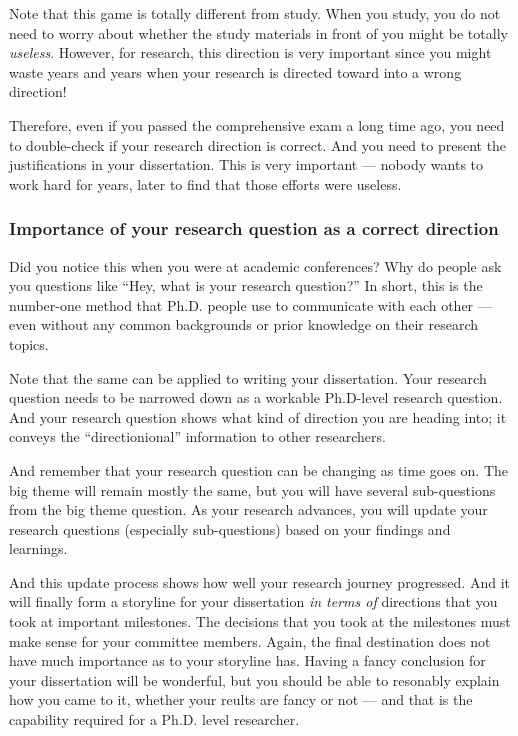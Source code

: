 \documentclass[11pt]{article}
\begin{document}
Note that this game is totally different from study. When you study, you do
not need to worry about whether the study materials in front of you might be
totally \emph{useless}. However, for research, this direction is very
important since you might waste years and years when your research is directed
toward into a wrong direction!

Therefore, even if you passed the comprehensive exam a long time ago, you need
to double-check if your research direction is correct. And you need to present
the justifications in your dissertation. This is very important --- nobody
wants to work hard for years, later to find that those efforts were useless. 


\subsubsection{Importance of your research question as a correct direction}

Did you notice this when you were at academic conferences? Why do people ask
you questions like ``Hey, what is your research question?'' In short, this is
the number-one method that Ph.D. people use to communicate with each other ---
even without any common backgrounds or prior knowledge on their research
topics.

Note that the same can be applied to writing your dissertation.  Your research
question needs to be narrowed down as a workable Ph.D-level research question.
And your research question shows what kind of direction you are heading into;
it conveys the ``directionional'' information to other researchers.

And remember that your research question can be changing as time goes on. The
big theme will remain mostly the same, but you will have several sub-questions
from the big theme question. As your research advances, you will update your
research questions (especially sub-questions) based on your findings and
learnings. 

And this update process shows how well your research journey progressed. And
it will finally form a storyline for your dissertation \emph{in terms of}
directions that you took at important milestones. The decisions that you took
at the milestones must make sense for your committee members. Again, the final
destination does not have much importance as to your storyline has. Having a
fancy conclusion for your dissertation will be wonderful, but you should be
able to resonably explain how you came to it, whether your reults are fancy or
not --- and that is the capability required for a Ph.D. level researcher. 
\end{document}
